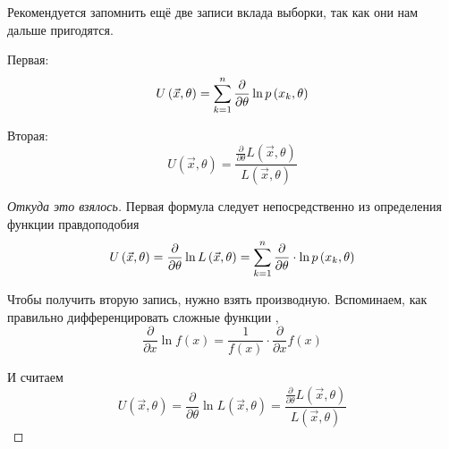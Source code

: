 \begin{remark}\label{remark:defU}
  Рекомендуется запомнить ещё две записи вклада выборки, так как они нам
  дальше пригодятся.

  Первая:
  \begin{align*}
    U\left( \vec{x},\theta \right)
    = \sum_{k=1}^n\frac{\partial}{\partial\theta}\ln{p\left(x_k,\theta\right)}
  \end{align*}

  Вторая:
  $$U\left( \vec{x},\theta \right)
    =\frac{\frac{\partial}{\partial\theta}L\left(\vec{x},\theta\right)}
      {L\left(\vec{x},\theta\right)}$$
\end{remark}
\begin{proof}[Откуда это взялось]
  Первая формула следует непосредственно из определения функции правдоподобия
  $$U\left( \vec{x},\theta \right)
      =\frac{\partial}{\partial\theta}\ln{L\left(\vec{x},\theta\right)}
      =\sum_{k=1}^n
        \frac{\partial}{\partial\theta}\cdot\ln{p\left(x_k,\theta\right)}$$

  Чтобы получить вторую запись, нужно взять производную.
  Вспоминаем, как правильно дифференцировать сложные функции
  \cite[с.~226]{Fichtenholz1}, \cite[с.~133]{DorogovtsevMA}
  $$\frac{\partial}{\partial x} \ln{f\left( x \right)}
    = \frac{1}{f\left( x \right)}
      \cdot \frac{\partial}{\partial x} f\left( x \right)$$

  И считаем
  $$U\left( \vec{x},\theta \right)
    =\frac{\partial}{\partial\theta}\ln{L\left(\vec{x},\theta\right)}
    =\frac{\frac{\partial}{\partial\theta}L\left(\vec{x},\theta\right)}
      {L\left(\vec{x},\theta\right)}$$
\end{proof}

